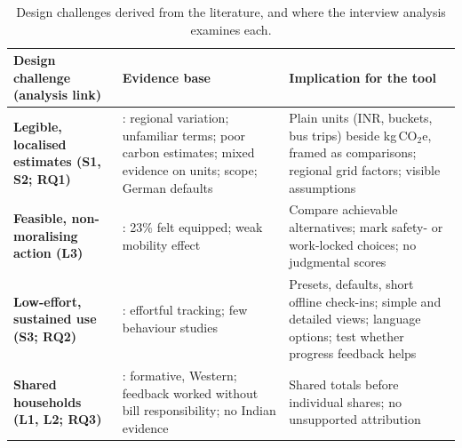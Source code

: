 \documentclass[10pt,a4paper,twocolumn]{article}
\begin{document}
\begin{table}[t]
\centering
\footnotesize
\setlength{\tabcolsep}{4pt}
\caption{Design challenges derived from the literature, and where the interview analysis examines each.}
\label{tab:challenges}
\begin{tabularx}{\textwidth}{>{\bfseries}p{4.3cm} p{5.6cm} X}
\toprule
\textbf{Design challenge (analysis link)} & \textbf{Evidence base} & \textbf{Implication for the tool}\\
\midrule
Legible, localised estimates (S1, S2; RQ1) & \cite{lee2021,gandhi2025,grinstein2018,mohanty2023,shi2021,koide2019,hoffmann2024}: regional variation; unfamiliar terms; poor carbon estimates; mixed evidence on units; scope; German defaults & Plain units (INR, buckets, bus trips) beside kg\,CO$_2$e, framed as comparisons; regional grid factors; visible assumptions\\
Feasible, non-moralising action (L3) & \cite{collins2020,hoffmann2024,brynjarsdottir2012}: 23\% felt equipped; weak mobility effect & Compare achievable alternatives; mark safety- or work-locked choices; no judgmental scores\\
Low-effort, sustained use (S3; RQ2) & \cite{hoffmann2024,froehlich2010,kok2021}: effortful tracking; few behaviour studies & Presets, defaults, short offline check-ins; simple and detailed views; language options; test whether progress feedback helps\\
Shared households (L1, L2; RQ3) & \cite{froehlich2012,tiefenbeck2019}: formative, Western; feedback worked without bill responsibility; no Indian evidence & Shared totals before individual shares; no unsupported attribution\\
\bottomrule
\end{tabularx}
\end{table}
\end{document}
